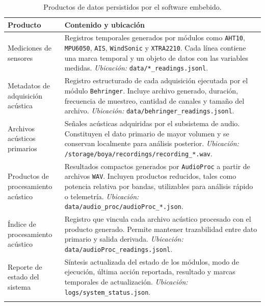 \begin{table}[htbp]
\centering
\caption{Productos de datos persistidos por el software embebido.}
\label{tab:productos_datos_software}
\footnotesize
\begingroup
\renewcommand{\arraystretch}{1.22}
\begin{tabularx}{\textwidth}{@{}>{\raggedright\arraybackslash}p{}>{\raggedright\arraybackslash}X@{}}
\toprule
\textbf{Producto} & \textbf{Contenido y ubicación} \tabularnewline
\midrule

Mediciones de sensores &
Registros temporales generados por módulos como \texttt{AHT10}, \texttt{MPU6050}, \texttt{AIS}, \texttt{WindSonic} y \texttt{XTRA2210}. Cada línea contiene una marca temporal y un objeto de datos con las variables medidas. \emph{Ubicación:} \texttt{data/*\_readings.jsonl}. \tabularnewline
\addlinespace[0.45em]

Metadatos de adquisición acústica &
Registro estructurado de cada adquisición ejecutada por el módulo \texttt{Behringer}. Incluye archivo generado, duración, frecuencia de muestreo, cantidad de canales y tamaño del archivo. \emph{Ubicación:} \texttt{data/behringer\_readings.jsonl}. \tabularnewline
\addlinespace[0.45em]

Archivos acústicos primarios &
Señales acústicas adquiridas por el subsistema de audio. Constituyen el dato primario de mayor volumen y se conservan localmente para análisis posterior. \emph{Ubicación:} \texttt{/storage/boya/recordings/recording\_*.wav}. \tabularnewline
\addlinespace[0.45em]

Productos de procesamiento acústico &
Resultados compactos generados por \texttt{AudioProc} a partir de archivos \texttt{WAV}. Incluyen productos reducidos, tales como potencia relativa por bandas, utilizables para análisis rápido o telemetría. \emph{Ubicación:} \texttt{data/audio\_proc/audioProc\_*.json}. \tabularnewline
\addlinespace[0.45em]

Índice de procesamiento acústico &
Registro que vincula cada archivo acústico procesado con el producto generado. Permite mantener trazabilidad entre dato primario y salida derivada. \emph{Ubicación:} \texttt{data/audioProc\_readings.jsonl}. \tabularnewline
\addlinespace[0.45em]

Reporte de estado del sistema &
Síntesis actualizada del estado de los módulos, modo de ejecución, última acción reportada, resultado y marcas temporales de actualización. \emph{Ubicación:} \texttt{logs/system\_status.json}. \tabularnewline
\addlinespace[0.45em]


\end{tabularx}
\end{table}
